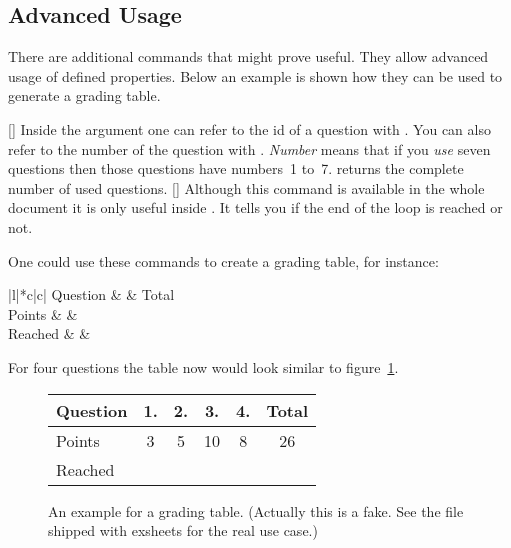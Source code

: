 \documentclass[load-preamble+]{cnltx-doc}
\begin{document}
\subsection{Advanced Usage}

There are additional commands that might prove useful.  They
allow advanced usage of defined properties.  Below an example is shown how
they can be used to generate a grading table.
\begin{commands}
  []
    Inside the argument one can refer to the \ac{id} of a
    question with .  You can also refer to the number of the
    question with .  \emph{Number} means that if you \emph{use}
    seven questions then those questions have numbers~1 to~7.
  \expandable{}
     returns the complete number of used questions.
  \expandable{}[]
    Although this command is available in the whole document it is only useful
    inside .  It tells you if the end of the loop is
    reached or not.
\end{commands}

One could use these commands to create a grading table, for instance:
\begin{sourcecode}
  \begin{tabular}{|l|*{\numberofquestions}{c|}c|}\hline
    Question &
       &
      Total \\ \hline
    Points   &
       &
      \pointssum* \\ \hline
    Reached  &
      \ForEachQuestion{\iflastquestion{}{&}} & \\ \hline
  \end{tabular}
\end{sourcecode}
For four questions the table now would look similar to
figure~\ref{fig:grading-table}.

\begin{figure}[ht]
  \centering
  \begin{tabular}{|l|*{4}{c|}c|}\hline
    Question & 1. & 2. & 3. & 4. & Total \\ \hline
    Points   &  3 &  5 & 10 &  8 & 26 \\ \hline
    Reached  &    &    &    &    &    \\ \hline
  \end{tabular}
  \caption{An example for a grading table. (Actually this is a fake. See the
     file shipped with exsheets for the real use case.)}
  \label{fig:grading-table}
\end{figure}
\end{document}

